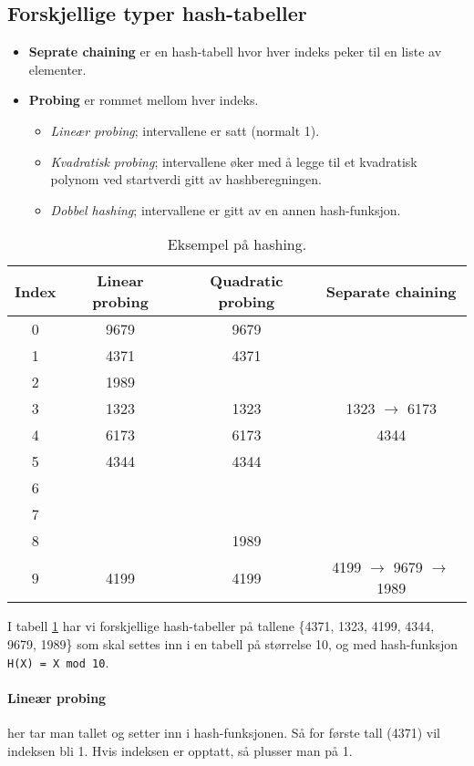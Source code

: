 \documentclass[11pt,a4paper]{article}
\theoremstyle{def}
\begin{document}
\subsection{Forskjellige typer hash-tabeller}
\begin{itemize}
\item
\textbf{Seprate chaining} er en hash-tabell hvor hver indeks peker til en liste av elementer.
\item
\textbf{Probing} er rommet mellom hver indeks.
\begin{itemize}
\item
\textit{Lineær probing}; intervallene er satt (normalt 1).
\item
\textit{Kvadratisk probing}; intervallene øker med å legge til et kvadratisk polynom ved startverdi gitt av hashberegningen.
\item
\textit{Dobbel hashing}; intervallene er gitt av en annen hash-funksjon.
\end{itemize}
\end{itemize}

\begin{table}[h!]
\centering
\begin{tabular}{c|c|c|c}
Index & Linear probing & Quadratic probing & Separate chaining\\
\hline
0 & 9679 & 9679 &\\
1 & 4371 & 4371 & \\
2 & 1989 & &\\
3 & 1323 & 1323 & 1323 $\rightarrow$ 6173\\
4 & 6173 & 6173 & 4344\\
5 & 4344 & 4344 &\\
6 & & &\\
7 & & &\\
8 & & 1989 &\\
9 & 4199 & 4199 & 4199 $\rightarrow$ 9679 $\rightarrow$ 1989\\
\end{tabular}
\label{tab:hash}
\caption{Eksempel på hashing.}
\end{table}
I tabell \ref{tab:hash} har vi forskjellige hash-tabeller på tallene \{4371, 1323, 4199, 4344, 9679, 1989\} som skal settes inn i en tabell på størrelse 10, og med hash-funksjon \texttt{H(X) = X mod 10}.

\paragraph{Lineær probing} her tar man tallet og setter inn i hash-funksjonen. Så for første tall (4371) vil indeksen bli 1. Hvis indeksen er opptatt, så plusser man på 1.
\end{document}
